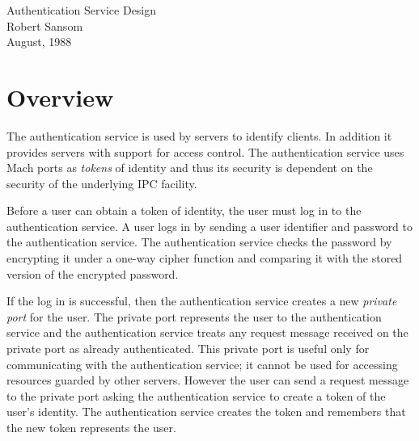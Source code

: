 
\oddsidemargin 0.25in
\evensidemargin 0.25in

\textwidth 6.0in
\topmargin 0in
\textheight 8in

\itemsep 0pt
\marginparwidth 1in

\newcommand{\psfigure}[3]{\psfigureon{#1}{#2}{#3}}
\newcommand{\psfigureoff}[3]{\setlength{\unitlength}{1in}\begin{picture}(#1,#2)\put(0,0){\framebox(#1,#2){#3}}\end{picture}}
\newcommand{\psfigureon}[3]{\setlength{\unitlength}{1in}\begin{picture}(#1,#2)\put(0,0){\special{psfile=#3}}\end{picture}}
\newcommand{\psfigureboxed}[3]{\setlength{\unitlength}{1in}\begin{picture}(#1,#2)\put(0,0){\special{psfile=#3}}\put(0,0){\framebox(#1,#2){}}\end{picture}}



\begin{center}
\LARGE Authentication Service Design \\[0.25in]
\Large Robert Sansom \\
\Large{August, 1988}
\vspace{0.25in}
\end{center}

\section{Overview}
The authentication service is used by servers to identify clients.  In
addition it provides servers with support for access control.  The
authentication service uses Mach ports as {\em tokens\/} of identity and
thus its security is dependent on the security of the underlying IPC
facility.

Before a user can obtain a token of identity, the user must log in to the
authentication service.  A user logs in by sending a user identifier and
password to the authentication service.  The authentication service checks
the password by encrypting it under a one-way cipher function and comparing
it with the stored version of the encrypted password.

If the log in is successful, then the authentication service creates a new
{\em private port\/} for the user.  The private port represents the user to
the authentication service and the authentication service treats any request
message received on the private port as already authenticated.  This private
port is useful only for communicating with the authentication service;  it
cannot be used for accessing resources guarded by other servers.  However
the user can send a request message to the private port asking the
authentication service to create a token of the user's identity.  The
authentication service creates the token and remembers that the new token
represents the user.


